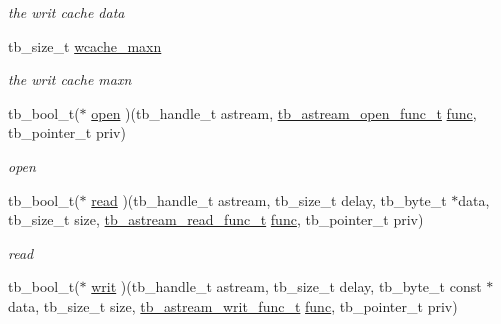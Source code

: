 \begin{DoxyCompactItemize}
{{{\begin{DoxyCompactList}\small\item\em the writ cache data \end{DoxyCompactList}\item 
\hypertarget{structtb__astream__t_ab744195618c24d053329711d2282885f}{tb\-\_\-size\-\_\-t \hyperlink{structtb__astream__t_ab744195618c24d053329711d2282885f}{wcache\-\_\-maxn}}\label{structtb__astream__t_ab744195618c24d053329711d2282885f}

\begin{DoxyCompactList}\small\item\em the writ cache maxn \end{DoxyCompactList}\item 
\hypertarget{structtb__astream__t_a156354a9d7751ddead43f17d83b7cc8d}{tb\-\_\-bool\-\_\-t($\ast$ \hyperlink{structtb__astream__t_a156354a9d7751ddead43f17d83b7cc8d}{open} )(tb\-\_\-handle\-\_\-t astream, \hyperlink{astream_8h_a02cb30011ecc7056a21bbdae23c0ab6d}{tb\-\_\-astream\-\_\-open\-\_\-func\-\_\-t} \hyperlink{structtb__astream__t_a758a20865d0e9bf0c6b0ee1613d7f9cb}{func}, tb\-\_\-pointer\-\_\-t priv)}\label{structtb__astream__t_a156354a9d7751ddead43f17d83b7cc8d}

\begin{DoxyCompactList}\small\item\em open \end{DoxyCompactList}\item 
\hypertarget{structtb__astream__t_a9710a34b1224d1a3997ac2cd1038e0e0}{tb\-\_\-bool\-\_\-t($\ast$ \hyperlink{structtb__astream__t_a9710a34b1224d1a3997ac2cd1038e0e0}{read} )(tb\-\_\-handle\-\_\-t astream, tb\-\_\-size\-\_\-t delay, tb\-\_\-byte\-\_\-t $\ast$data, tb\-\_\-size\-\_\-t size, \hyperlink{astream_8h_a94c551da39b2f5d59cf37a8154267c00}{tb\-\_\-astream\-\_\-read\-\_\-func\-\_\-t} \hyperlink{structtb__astream__t_a758a20865d0e9bf0c6b0ee1613d7f9cb}{func}, tb\-\_\-pointer\-\_\-t priv)}\label{structtb__astream__t_a9710a34b1224d1a3997ac2cd1038e0e0}

\begin{DoxyCompactList}\small\item\em read \end{DoxyCompactList}\item 
\hypertarget{structtb__astream__t_aa55af2461da9a02d6a8dec01adbe999d}{tb\-\_\-bool\-\_\-t($\ast$ \hyperlink{structtb__astream__t_aa55af2461da9a02d6a8dec01adbe999d}{writ} )(tb\-\_\-handle\-\_\-t astream, tb\-\_\-size\-\_\-t delay, tb\-\_\-byte\-\_\-t const $\ast$data, tb\-\_\-size\-\_\-t size, \hyperlink{astream_8h_afbb9676c016d2e631bf4bc06836f4a45}{tb\-\_\-astream\-\_\-writ\-\_\-func\-\_\-t} \hyperlink{structtb__astream__t_a758a20865d0e9bf0c6b0ee1613d7f9cb}{func}, tb\-\_\-pointer\-\_\-t priv)}\label{structtb__astream__t_aa55af2461da9a02d6a8dec01adbe999d}

}}}
\end{DoxyCompactItemize}
